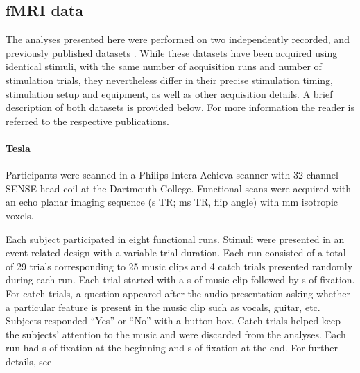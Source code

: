 \subsection*{fMRI data}

The analyses presented here were performed on two independently recorded, and
previously published datasets \citep{CTK+2012,HDH+2015} . While these datasets
have been acquired using identical stimuli, with the same number of acquisition
runs and number of stimulation trials, they nevertheless differ in their
precise stimulation timing, stimulation setup and equipment, as well as other
acquisition details. A brief description of both datasets is provided below.
For more information the reader is referred to the respective publications.


\paragraph{\unit[3]{Tesla}}
%
Participants were scanned in a Philips Intera Achieva scanner with 32 channel
SENSE head coil at the Dartmouth College. Functional scans were acquired with
an echo planar imaging sequence (\unit[2]{s} TR; \unit[35]{ms} TR,
\unit[90]{\textdegree} flip angle) with \unit[3]{mm} isotropic voxels.

Each subject participated in eight functional runs. Stimuli were presented in
an event-related design with a variable trial duration. Each run consisted of a
total of 29 trials corresponding to 25 music clips and 4 catch trials presented
randomly during each run. Each trial started with a \unit[6]{s} of music clip
followed by \unit[4-8]{s} of fixation. For catch trials, a question appeared
after the audio presentation asking whether a particular feature is present in
the music clip such as vocals, guitar, etc. Subjects responded “Yes” or “No”
with a button box. Catch trials helped keep the subjects’ attention to the
music and were discarded from the analyses. Each run had \unit[4]{s} of
fixation at the beginning and \unit[10]{s} of fixation at the end. For further
details, see \citet{CTK+2012}

